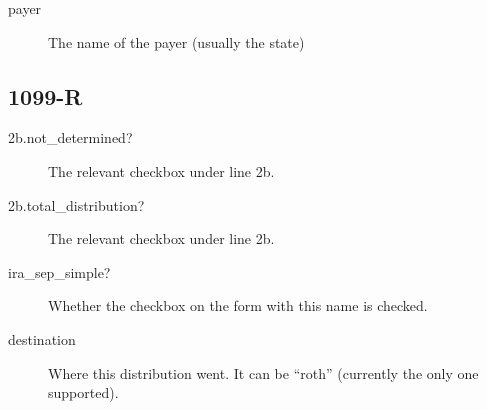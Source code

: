 \begin{description}
\item[payer] The name of the payer (usually the state)
\end{description}


\subsection{1099-R}

\begin{description}
\item[2b.not\_determined?] The relevant checkbox under line 2b.
\item[2b.total\_distribution?] The relevant checkbox under line 2b.
\item[ira\_sep\_simple?] Whether the checkbox on the form with this name is
checked.
\item[destination] Where this distribution went. It can be ``roth''
(currently the only one supported).
\end{description}



